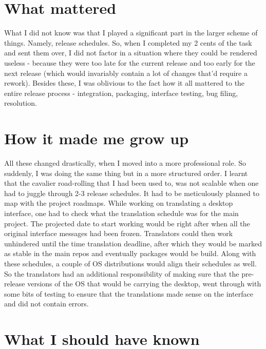 \section*{What mattered}

What I did not know was that I played a significant part in the larger scheme of things. Namely, release schedules. So, when I completed my 2 cents of the task and sent them over, I did not factor in a situation where they could be rendered useless - because they were too late for the current release and too early for the next release (which would invariably contain a lot of changes that'd require a rework).  Besides these, I was oblivious to the fact how it all mattered to the entire release process - integration, packaging, interface testing, bug filing, resolution.

\section*{How it made me grow up}

All these changed drastically, when I moved into a more professional role. So suddenly, I was doing the same thing but in a more structured order. I learnt that the cavalier road-rolling that I had been used to, was not scalable when one had to juggle through 2-3 release schedules. It had to be meticulously planned to map with the project roadmaps. While working on translating a desktop interface, one had to check what the translation schedule was for the main project. The projected date to start working would be right after when all the original interface messages had been frozen. Translators could then work unhindered until the time translation deadline, after which they would be marked as stable in the main repos and eventually packages would be build. Along with these schedules, a couple of OS distributions would align their schedules as well. So the translators had an additional responsibility of making sure that the pre-release versions of the OS that would be carrying the desktop, went through with some bits of testing to ensure that the translations made sense on the interface and did not contain errors.

\section*{What I should have known}

